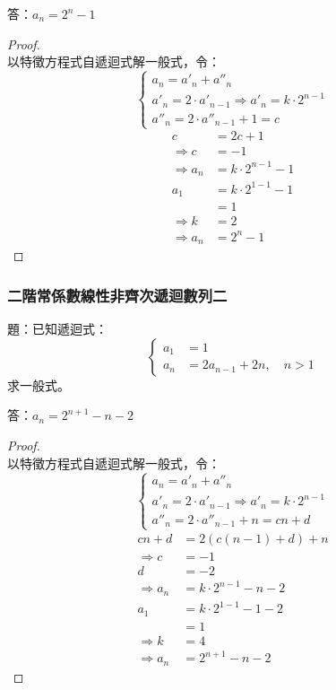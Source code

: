 \documentclass[a4paper,12pt]{article}
\begin{document}
答：\(a_n = 2^{n}-1\)
\begin{proof}\mbox{}\\
以特徵方程式自遞迴式解一般式，令：
\[
\begin{cases}
a_n = a'_n+a''_n \\
a'_n = 2\cdot a'_{n-1} \Rightarrow a'_n = k\cdot 2^{n-1} \\
a''_n = 2\cdot a''_{n-1}+1 = c
\end{cases}
\]
\[
\begin{aligned}
c &= 2c+1 \\
\Rightarrow c &= -1 \\
\Rightarrow a_n &= k\cdot 2^{n-1}-1 \\
a_1 &= k\cdot 2^{1-1}-1 \\
&= 1 \\
\Rightarrow k &= 2 \\
\Rightarrow a_n &= 2^{n}-1
\end{aligned}
\]
\end{proof}
\subsubsection{二階常係數線性非齊次遞迴數列二}
題：已知遞迴式：
\[
\begin{cases}
a_1 &= 1 \\
a_{n} &= 2a_{n-1} + 2n,\quad n>1
\end{cases}
\]
求一般式。

答：$a_n = 2^{n+1}-n-2$
\begin{proof}\mbox{}\\
以特徵方程式自遞迴式解一般式，令：
\[
\begin{cases}
a_n = a'_n+a''_n \\
a'_n = 2\cdot a'_{n-1} \Rightarrow a'_n = k\cdot 2^{n-1}\\
a''_n = 2\cdot a''_{n-1}+n = cn+d
\end{cases}
\]
\[
\begin{aligned}
cn+d &= 2(c(n-1)+d)+n \\
\Rightarrow c &= -1 \\
d &= -2 \\
\Rightarrow a_n &= k\cdot 2^{n-1}-n-2 \\
a_1 &= k\cdot 2^{1-1}-1-2 \\
&= 1 \\
\Rightarrow k &= 4 \\
\Rightarrow a_n &= 2^{n+1}-n-2
\end{aligned}
\]
\end{proof}
\end{document}
